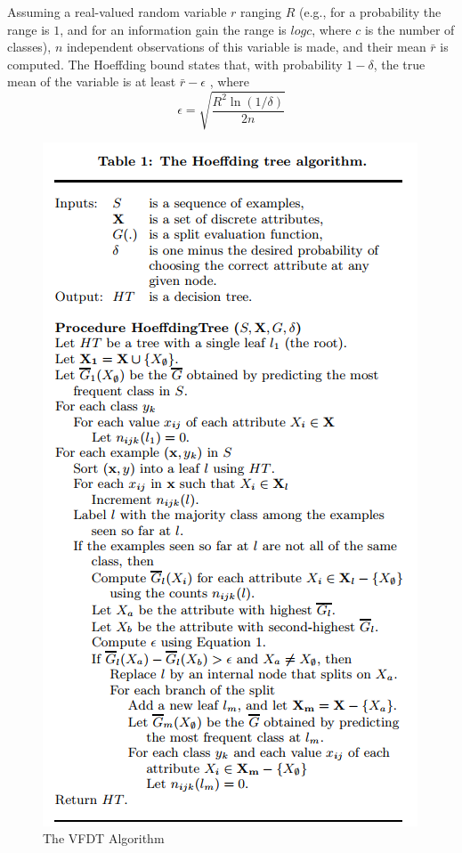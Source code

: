 \documentclass[sigplan]{acmart}\settopmatter{printfolios=true,printccs=false,printacmref=false}
\begin{document}
Assuming a real-valued random variable $r$ ranging $R$ (e.g., for a probability the range is $1$, and for an information gain the range is $log c$, where $c$ is the number of classes), $n$ independent observations of this variable is made, and their mean $\bar{r}$ is computed. The Hoeffding bound states that, with probability $1-\delta$, the true mean of the variable is at least $\bar{r}-\epsilon$ , where 
\begin{equation}
	\epsilon = \sqrt{\frac{R^2\ln(1/\delta)}{2n}}
\end{equation}

\begin{figure}
	\includegraphics[width=\linewidth]{figs/vfdt.PNG}
	\caption{The VFDT Algorithm \cite{domingos2000mining}}
	\label{fig:vfdt}
\end{figure}
\end{document}

